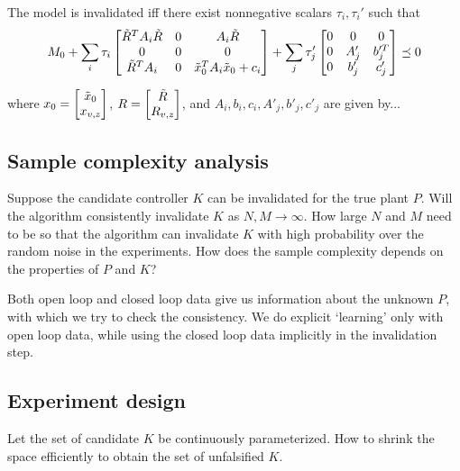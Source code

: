 \documentclass[11pt, onecolumn]{article}
\begin{document}
\begin{corollary}
The model is invalidated iff there exist nonnegative scalars $\tau_i, \tau_i'$ such that
  \begin{align*}
  M_0 + \sum_i \tau_i\begin{bmatrix}\tilde R^T A_i \tilde R &0 & A_i \tilde R\\0 & 0 & 0\\\tilde R^T A_i &0& \tilde x_0^TA_i\tilde x_0 + c_i\end{bmatrix} + \sum_j \tau_j'\begin{bmatrix}0 & 0 & 0 \\ 0 & A_j' & b_j'^T\\0 & b_j' & c_j'\end{bmatrix} \preceq 0
  \end{align*}
\end{corollary}

where $x_0 = \begin{bmatrix}\tilde x_0\\ x_{v,z}\end{bmatrix}$, $R = \begin{bmatrix}\tilde R\\R_{v,z}\end{bmatrix}$, and $A_i,b_i,c_i,A'_j,b'_j,c'_j$ are given by...

\subsection{Sample complexity analysis}

Suppose the candidate controller $K$ can be invalidated for the true plant $P$.   Will
the algorithm consistently invalidate $K$ as $N,M\to\infty$.  How large $N$ and $M$ need to be so that the
algorithm can invalidate $K$ with high probability over the random noise in the experiments. How
does the sample complexity depends on the properties of $P$ and $K$?

Both open loop and closed loop data give us information about the unknown $P$, with which we try to
check the consistency.  We do explicit `learning' only with open loop data, while using the closed
loop data implicitly in the invalidation step.


\subsection{Experiment design}

Let the set of candidate $K$ be continuously parameterized. How to shrink the space efficiently to
obtain the set of unfalsified $K$.

\end{document}
